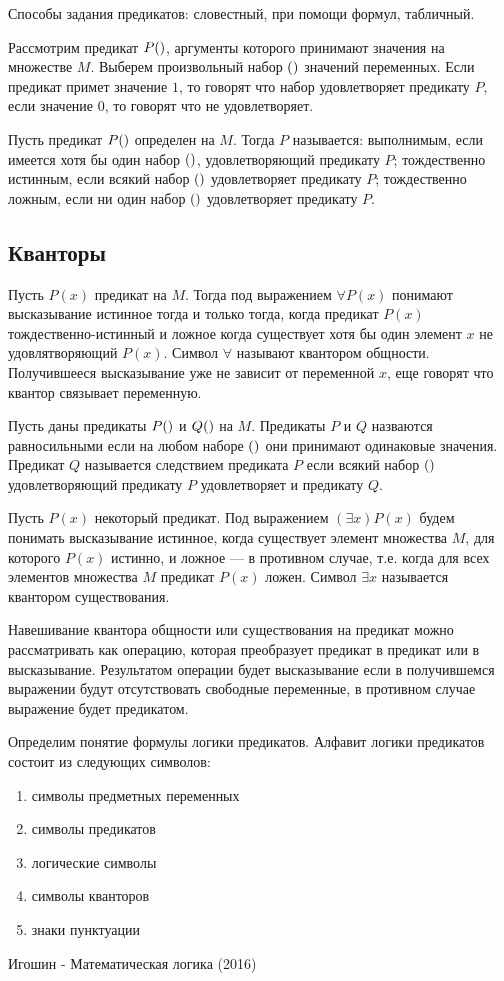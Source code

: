 \documentclass[letterpaper, 10pt]{article}
\theoremstyle{definition}
\begin{document}
	Способы задания предикатов: словестный, при помощи формул, табличный.

	Рассмотрим предикат $P(\rseq x)$, аргументы которого принимают
	значения на множестве $M$. Выберем произвольный набор $(\rseq a)$
	значений переменных. Если предикат примет значение $1$, то говорят что набор
	удовлетворяет предикату $P$, если значение $0$, то говорят что не
	удовлетворяет.

	Пусть предикат $P(\rseq x)$ определен на $M$. Тогда $P$ называется:
	выполнимым, если имеется хотя бы один набор $(\rseq a)$, удовлетворяющий
	предикату $P$;
	тождественно истинным, если всякий набор $(\rseq a)$ удовлетворяет предикату
	$P$;
	тождественно ложным, если ни один набор  $(\rseq a)$ удовлетворяет предикату
	$P$.

	\subsection{Кванторы}
	Пусть $P(x)$ предикат на $M$. Тогда под выражением $\forall P(x)$ понимают
	высказывание истинное тогда и только тогда, когда предикат $P(x)$
	тождественно-истинный и ложное когда существует хотя бы один элемент $x$ не
	удовлятворяющий $P(x)$.
	Символ $\forall$ называют квантором общности. Получившееся высказывание уже
	не зависит от переменной $x$, еще говорят что квантор связывает переменную.

	Пусть даны предикаты $P(\rseq x)$ и $Q(\rseq x)$ на $M$. Предикаты $P$ и $Q$
	назваются равносильными если на любом наборе $(\rseq a)$ они принимают
	одинаковые значения. Предикат $Q$ называется следствием предиката $P$ если
	всякий набор $(\rseq a)$ удовлетворяющий предикату $P$ удовлетворяет и
	предикату $Q$.

	Пусть $P(x)$ некоторый предикат. Под выражением $(\exists x )P(x)$ будем
	понимать высказывание истинное, когда существует элемент множества $M$, для
	которого $P(x)$ истинно, и ложное --- в противном случае, т.е. когда для
	всех элементов множества $M$ предикат $P(x)$ ложен. Символ $\exists x$
	называется квантором существования.

	Навешивание квантора общности или существования на предикат можно
	рассматривать как операцию, которая преобразует предикат в предикат или в
	высказывание. Результатом операции будет высказывание если в получившемся
	выражении будут отсутствовать свободные переменные, в противном случае
	выражение будет предикатом.

	Определим понятие формулы логики предикатов.
	Алфавит логики предикатов состоит из следующих символов:
	\begin{enumerate}
		\item символы предметных переменных
		\item символы предикатов
		\item логические символы
		\item символы кванторов
		\item знаки пунктуации
	\end{enumerate}
	Игошин - Математическая логика (2016)
\end{document}
